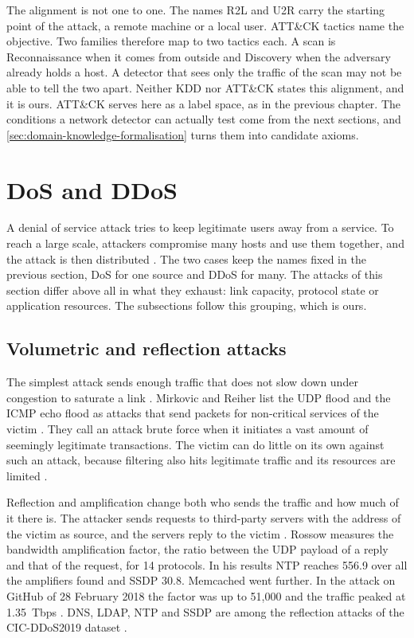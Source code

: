 The alignment is not one to one. The names R2L and U2R carry the starting
point of the attack, a remote machine or a local user. ATT\&CK tactics name
the objective. Two families therefore map to two tactics each. A scan is
Reconnaissance when it comes from outside and Discovery when the adversary
already holds a host. A detector that sees only the traffic of the scan may
not be able to tell the two apart. Neither KDD nor ATT\&CK states this
alignment, and it is ours. ATT\&CK serves here as a label space, as in the
previous chapter. The conditions a network detector can actually test come
from the next sections, and \cref{sec:domain-knowledge-formalisation} turns
them into candidate axioms.

\section{DoS and DDoS}
\label{sec:dos-ddos}

A denial of service attack tries to keep legitimate users away from a
service. To reach a large scale, attackers compromise many hosts and use them
together, and the attack is then distributed \citep{handley2006rfc4732}. The
two cases keep the names fixed in the previous section, DoS for one source
and DDoS for many. The attacks of this section differ above all in what they
exhaust: link capacity, protocol state or application resources. The
subsections follow this grouping, which is ours.

\subsection{Volumetric and reflection attacks}
\label{sec:volumetric-attacks}

The simplest attack sends enough traffic that does not slow down under
congestion to saturate a link \citep{handley2006rfc4732}. Mirkovic and Reiher
list the UDP flood and the ICMP echo flood as attacks that send packets for
non-critical services of the victim \citep{mirkovic2004taxonomy}. They call an
attack brute force when it initiates a vast amount of seemingly legitimate
transactions. The victim can do little on its own against such an attack,
because filtering also hits legitimate traffic and its resources are limited
\citep{mirkovic2004taxonomy}.

Reflection and amplification change both who sends the traffic and how much
of it there is. The attacker sends requests to third-party servers with the
address of the victim as source, and the servers reply to the victim
\citep{rossow2014amplification}. Rossow measures the bandwidth amplification
factor, the ratio between the UDP payload of a reply and that of the request,
for 14 protocols. In his results NTP reaches 556.9 over all the amplifiers
found and SSDP 30.8. Memcached went further. In the attack on GitHub of 28
February 2018 the factor was up to 51{,}000 and the traffic peaked at
1.35~Tbps \citep{kottler2018github}. DNS, LDAP, NTP and SSDP are among the
reflection attacks of the CIC-DDoS2019 dataset \citep{cic2019ddos}.

